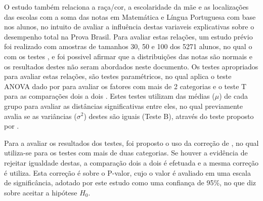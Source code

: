 O estudo também relaciona a raça/cor, a escolaridade da mãe e as localizações das escolas com a soma das notas em Matemática 
e Língua Portuguesa com base nos alunos, no intuito de avaliar a influência destas variaveis explicativas sobre o desempenho
total na Prova Brasil. Para avaliar estas relações, um estudo prévio foi realizado com amostras de tamanhos 30, 50 e 100 dos 5271
alunos, no qual o com os testes ,  e 
foi possivel afirmar que a distribuições das notas são normais e os resultados destes não seram abordados neste documento. Os testes 
apropriados para avaliar estas relações, são testes paramétricos, no qual aplica o teste ANOVA dado por  para 
avaliar os fatores com mais de 2 categorias e o teste T para as comparações dois a dois \cite{o1908student}.
Estes testes utilizam das médias ($\mu$) de cada grupo para avaliar as distâncias significativas entre eles, no qual previamente avalia se as
variâncias ($\sigma^2$) destes são iguais (Teste B), através do teste proposto por .

Para a avaliar os resultados dos testes, foi proposto o uso da correção de , no qual utiliza-se para os 
testes com mais de duas categorias. Se houver a evidência de rejeitar igualdade destas, a comparação dois a dois é efetuada e a mesma correção
é utiliza. Esta correção é sobre o P-valor, cujo o valor é avaliado em uma escala de significância, adotado por este estudo
como uma confiança de 95\%, no que diz sobre aceitar a hipótese $H_0$.